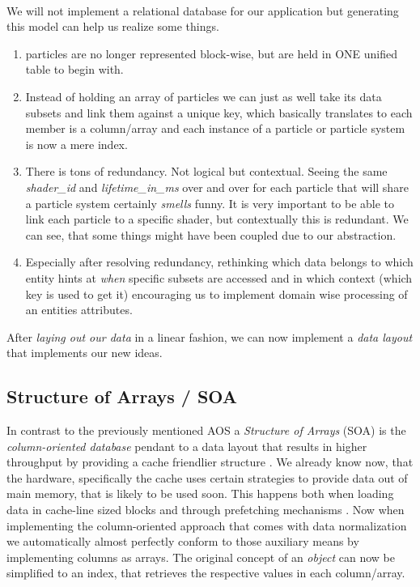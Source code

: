 \\
We will not implement a relational database for our application but generating this model can help us realize some things.
\begin{enumerate}
	\item particles are no longer represented block-wise, but are held in ONE unified table to begin with.
	\item Instead of holding an array of particles we can just as well take its data subsets and link them against a unique key, which basically translates to each member is a column/array and each instance of a particle or particle system is now a mere index.
	\item There is tons of redundancy. Not logical but contextual. Seeing the same \textit{shader\_id} and \textit{lifetime\_in\_ms} over and over for each particle that will share a particle system certainly \textit{smells} funny. It is very important to be able to link each particle to a specific shader, but contextually this is redundant. We can see, that some things might have been coupled due to our abstraction.
	\item Especially after resolving redundancy, rethinking which data belongs to which entity hints at \textit{when} specific subsets are accessed and in which context (which key is used to get it) encouraging us to implement domain wise processing of an entities attributes.
\end{enumerate}
After \textit{laying out our data} in a linear fashion, we can now implement a \textit{data layout} that implements our new ideas.

\subsection{Structure of Arrays / SOA}\label{soa}
In contrast to the previously mentioned AOS  a \textit{Structure of Arrays} (SOA) is the \textit{column-oriented database} pendant to a data layout that results in higher throughput by providing a cache friendlier structure . We already know now, that the hardware, specifically the cache uses certain strategies to provide data out of main memory, that is likely to be used soon. This happens both when loading data in cache-line sized blocks and through prefetching mechanisms . Now when implementing the column-oriented approach that comes with data normalization we automatically almost perfectly conform to those auxiliary means by implementing columns as arrays. The original concept of an \textit{object} can now be simplified to an index, that retrieves the respective values in each column/array.

